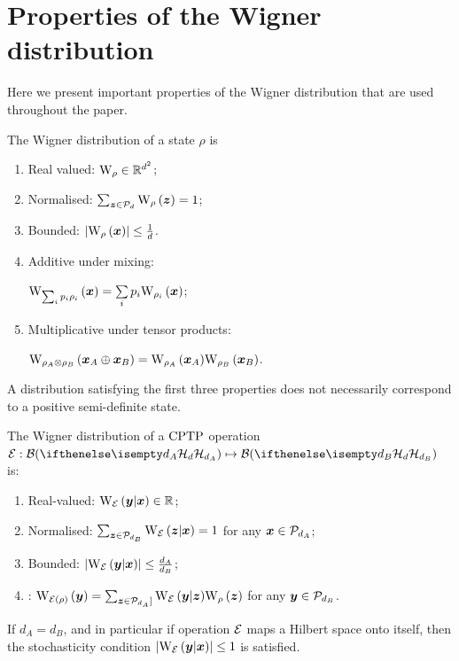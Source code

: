 \section{Properties of the Wigner distribution}
\label{app:wigner}

Here we present important properties of the Wigner distribution that are used throughout the paper.

\begin{proposition}\label{thm:wstate}
    The Wigner distribution of a state $\rho$ is
    \begin{enumerate}
        \item\label{en:w1} Real valued: $\W{\rho} \in \mathbb{R}^{d^2}$;
        \item\label{en:w2} Normalised: $\sum_{\bmz \in \cal{P}_d} \W[\bmz]{\rho}=1$;
        \item\label{en:w3} Bounded: $\abs{\W[\bmx]{\rho}} \leq \frac{1}{d}$.
        \item\label{en:w4} Additive under mixing:
        
        $\W[\bmx]{\sum_i p_i \rho_i} = \sum\limits_i p_i \W[\bmx]{\rho_i}$;
        \item\label{en:w5} Multiplicative under tensor products: 
        
        $\W[\bmx_A \oplus \bmx_B]{\rho_A \otimes \rho_B} = \W[\bmx_A]{\rho_A}\W[\bmx_B]{\rho_B}$.
	\end{enumerate}
\end{proposition}
A distribution satisfying the first three properties does not necessarily correspond to a positive semi-definite state.

\begin{proposition}
    \label{thm:wchannel}
    The Wigner distribution of a ${\rm{CPTP}}$ operation $\E: \cal{B}(\hd[d_A]) \mapsto \cal{B}(\hd[d_B])$ is:
    \begin{enumerate}
        \item\label{en:wo1} Real-valued: $\W[\bmy|\bmx]{\E} \in \mathbb{R}$;
        \item\label{en:wo2} Normalised: $\sum_{\bmz \in \cal{P}_{d_B}} \W[\bmz|\bmx]{\E} = 1$ for any $\bm{x} \in \mathcal{P}_{d_A}$;
        \item\label{en:wo3} Bounded: $\abs{\W[\bmy|\bmx]{\E}} \leq \frac{d_A}{d_B}$;
	    \item\label{en:wo4} : $\W[\bmy]{\E(\rho)} = \sum_{\bmz \in \cal{P}_{d_A}]} \W[\bmy|\bmz]{\E} \W[\bmz]{\rho}$ for any $\bm{y} \in \mathcal{P}_{d_B}$.
    \end{enumerate}
\end{proposition}
If $d_A = d_B$, and in particular if operation $\mathcal{E}$ maps a Hilbert space onto itself, then the stochasticity condition $\abs{\W[\bmy|\bmx]{\E}} \leq 1$ is satisfied.

